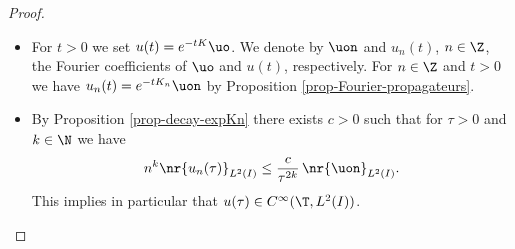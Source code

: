 \skpt
\begin{proof}
\begin{itemize}
\item
For $t > 0$ we set $u(t) = e^{-tK} \uo$. We denote by $\uon$ and $u_n(t)$, $n \in \Z$, the Fourier coefficients of $\uo$ and $u(t)$, respectively. For $n \in \Z$ and $t > 0$ we have $u_n(t) = e^{-t K_n} \uon$ by Proposition \ref{prop-Fourier-propagateurs}.

\item
By Proposition \ref{prop-decay-expKn} there exists $c > 0$ such that for $\tau > 0$ and $k \in \N$ we have
\begin{equation} \label{eq-estim-nk-un}
n^k \nr{u_n(\tau)}_{L^2(I)} \leq \frac c {\tau^{2k}}\, \nr{\uon}_{L^2(I)}.
\end{equation}
This implies in particular that $u(\tau) \in C^\infty(\T,L^2(I))$.


\end{itemize}
\end{proof}
